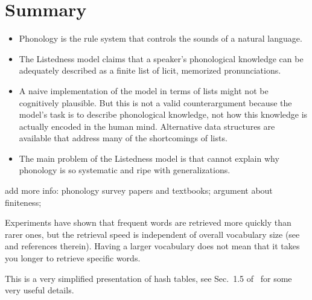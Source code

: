 \section{Summary}
\label{sec:listphonology_summary}

\begin{insights}
    \begin{itemize}
        \item Phonology is the rule system that controls the sounds of a natural language.
        \item The Listedness model claims that a speaker's phonological knowledge can be adequately described as a finite list of licit, memorized pronunciations.
        \item A naive implementation of the model in terms of lists might not be cognitively plausible.
              But this is not a valid counterargument because the model's task is to describe phonological knowledge, not how this knowledge is actually encoded in the human mind.
              Alternative data structures are available that address many of the shortcomings of lists.
        \item The main problem of the Listedness model is that cannot explain why phonology is so systematic and ripe with generalizations.
    \end{itemize}
\end{insights}

\begin{literature}
add more info:
phonology survey papers and textbooks;
argument about finiteness;

Experiments have shown that frequent words are retrieved more quickly than rarer ones, but the retrieval speed is independent of overall vocabulary size (see \citealt{Jurafsky03} and references therein).
Having a larger vocabulary does not mean that it takes you longer to retrieve specific words.

This is a very simplified presentation of hash tables, see Sec.~1.5 of~\citet{DasguptaEtAl06} for some very useful details.
\end{literature}

